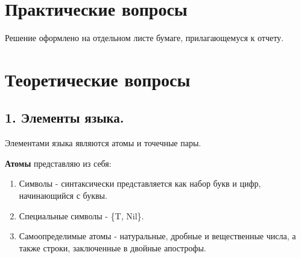 \section*{Практические вопросы}

Решение оформлено на отдельном листе бумаге, прилагающемуся к отчету.

\section*{Теоретические вопросы}
\setcounter{page}{2}









\subsection*{1. Элементы языка.}

Элементами языка являются атомы и точечные пары.

\textbf{Атомы} представляю из себя:
\begin{enumerate}
	\item Символы - синтаксически представляется как набор букв и цифр, начинающийся с буквы.
	\item Специальные символы - \{T, Nil\}.
	\item Самоопределимые атомы - натуральные, дробные и вещественные числа, а также строки, заключенные в двойные апострофы. 
\end{enumerate}

